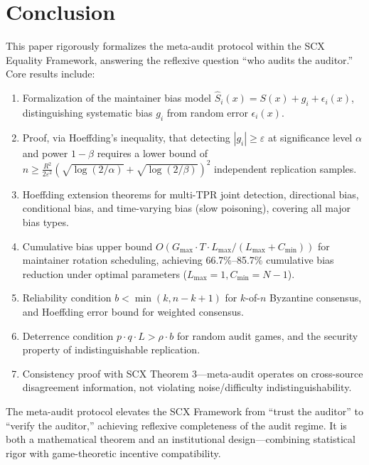 \documentclass[11pt,a4paper]{article}
\theoremstyle{definition}
\begin{document}
\section{Conclusion}

\noindent
This paper rigorously formalizes the meta-audit protocol within the SCX Equality Framework, answering the reflexive question ``who audits the auditor.'' Core results include:

\begin{enumerate}[leftmargin=*, label=\textbf{•}]
    \item Formalization of the maintainer bias model $\hat{S}_i(x) = S(x) + g_i + \epsilon_i(x)$, distinguishing systematic bias $g_i$ from random error $\epsilon_i(x)$.
    \item Proof, via Hoeffding's inequality, that detecting $|g_i| \geq \varepsilon$ at significance level $\alpha$ and power $1-\beta$ requires a lower bound of $n \geq \frac{R^2}{2\varepsilon^2} (\sqrt{\log(2/\alpha)} + \sqrt{\log(2/\beta)})^2$ independent replication samples.
    \item Hoeffding extension theorems for multi-TPR joint detection, directional bias, conditional bias, and time-varying bias (slow poisoning), covering all major bias types.
    \item Cumulative bias upper bound $O(G_{\max} \cdot T \cdot L_{\max}/(L_{\max} + C_{\min}))$ for maintainer rotation scheduling, achieving 66.7\%--85.7\% cumulative bias reduction under optimal parameters ($L_{\max}=1, C_{\min}=N-1$).
    \item Reliability condition $b < \min(k, n-k+1)$ for $k$-of-$n$ Byzantine consensus, and Hoeffding error bound for weighted consensus.
    \item Deterrence condition $p \cdot q \cdot L > \rho \cdot b$ for random audit games, and the security property of indistinguishable replication.
    \item Consistency proof with SCX Theorem 3---meta-audit operates on cross-source disagreement information, not violating noise/difficulty indistinguishability.
\end{enumerate}

The meta-audit protocol elevates the SCX Framework from ``trust the auditor'' to ``verify the auditor,'' achieving reflexive completeness of the audit regime. It is both a mathematical theorem and an institutional design---combining statistical rigor with game-theoretic incentive compatibility.
\end{document}
